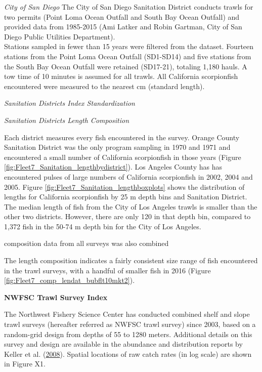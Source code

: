 \documentclass[12pt,]{article}
\begin{document}
\emph{City of San Diego} The City of San Diego Sanitation District
conducts trawls for two permits (Point Loma Ocean Outfall and South Bay
Ocean Outfall) and provided data from 1985-2015 (Ami Latker and Robin
Gartman, City of San Diego Public Utilities Department).\\
Stations sampled in fewer than 15 years were filtered from the dataset.
Fourteen stations from the Point Loma Ocean Outfall (SD1-SD14) and five
stations from the South Bay Ocean Outfall were retained (SD17-21),
totaling 1,180 hauls. A tow time of 10 minutes is assumed for all
trawls. All California scorpionfish encountered were measured to the
nearest cm (standard length).

\emph{Sanitation Districts Index Standardization}

\emph{Sanitation Districts Length Composition}

Each district measures every fish encountered in the survey. Orange
County Sanitation District was the only program sampling in 1970 and
1971 and encountered a small number of California scorpionfish in those
years (Figure \ref{fig:Fleet7_Sanitation_lengthbydistrict}). Los Angeles
County has has encountered pulses of large numbers of California
scorpionfish in 2002, 2004 and 2005. Figure
\ref{fig:Fleet7_Sanitation_lengthboxplots} shows the distribution of
lengths for California scorpionfish by 25 m depth bins and Sanitation
District. The median length of fish from the City of Los Angeles trawls
is smaller than the other two districts. However, there are only 120 in
that depth bin, compared to 1,372 fish in the 50-74 m depth bin for the
City of Los Angeles.

composition data from all surveys was also combined

The length composition indicates a fairly consistent size range of fish
encountered in the trawl surveys, with a handful of smaller fish in 2016
(Figure \ref{fig:Fleet7_comp_lendat_bubflt10mkt2}).

\textbf{NWFSC Trawl Survey Index}

The Northwest Fishery Science Center has conducted combined shelf and
slope trawl surveys (hereafter referred as NWFSC trawl survey) since
2003, based on a random-grid design from depths of 55 to 1280 meters.
Additional details on this survey and design are available in the
abundance and distribution reports by Keller et al.
(\protect\hyperlink{ref-Keller2008}{2008}). Spatial locations of raw
catch rates (in log scale) are shown in Figure X1.
\end{document}
